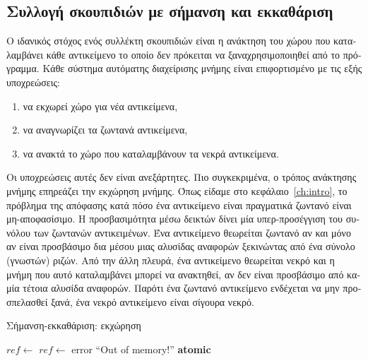 \begin{greek}
\chapter{Συλλογή σκουπιδιών με σήμανση και εκκαθάριση}\label{ch:mrkswp}

Ο ιδανικός στόχος ενός συλλέκτη σκουπιδιών είναι η ανάκτηση
του χώρου που καταλαμβάνει κάθε αντικείμενο το οποίο δεν
πρόκειται να ξαναχρησιμοποιηθεί από το πρόγραμμα. Κάθε
σύστημα αυτόματης διαχείρισης μνήμης είναι επιφορτισμένο με
τις εξής υποχρεώσεις:

\begin{enumerate}
  \item να εκχωρεί χώρο για νέα αντικείμενα,
  \item να αναγνωρίζει τα ζωντανά αντικείμενα,
  \item να ανακτά το χώρο που καταλαμβάνουν τα νεκρά αντικείμενα.
\end{enumerate}

Οι υποχρεώσεις αυτές δεν είναι ανεξάρτητες. Πιο συγκεκριμένα,
ο τρόπος ανάκτησης μνήμης επηρεάζει την εκχώρηση μνήμης. Όπως
είδαμε στο κεφάλαιο~\ref{ch:intro}, το πρόβλημα της απόφασης
κατά πόσο ένα αντικείμενο είναι πραγματικά ζωντανό είναι
μη-αποφασίσιμο. Η προσβασιμότητα μέσω δεικτών δίνει μία
υπερ-προσέγγιση του συνόλου των ζωντανών αντικειμένων. Ένα
αντικείμενο θεωρείται ζωντανό αν και μόνο αν είναι προσβάσιμο
δια μέσου μιας αλυσίδας αναφορών ξεκινώντας από ένα σύνολο
(γνωστών) ριζών. Από την άλλη πλευρά, ένα αντικείμενο θεωρείται
νεκρό και η μνήμη που αυτό καταλαμβάνει μπορεί να ανακτηθεί,
αν δεν είναι προσβάσιμο από καμία τέτοια αλυσίδα αναφορών.
Παρότι ένα ζωντανό αντικείμενο ενδέχεται να μην προσπελασθεί
ξανά, ένα νεκρό αντικείμενο είναι σίγουρα νεκρό.

\begin{algorithm}
  \caption{Σήμανση-εκκαθάριση: εκχώρηση}
  \label{alg:mrkswp_1}
  \begin{algorithmic}[1]
      \State $ref \gets$ 
       
        \State {}
        \State $ref \gets$ 
          \State error ``Out of memory!''
        \EndIf
      \EndIf
      \State {}
    \EndProcedure
    \Statex
      \State \textbf{atomic}
      \State {}
      \State {}
    \EndProcedure
  \end{algorithmic}
\end{algorithm}


\end{greek}

